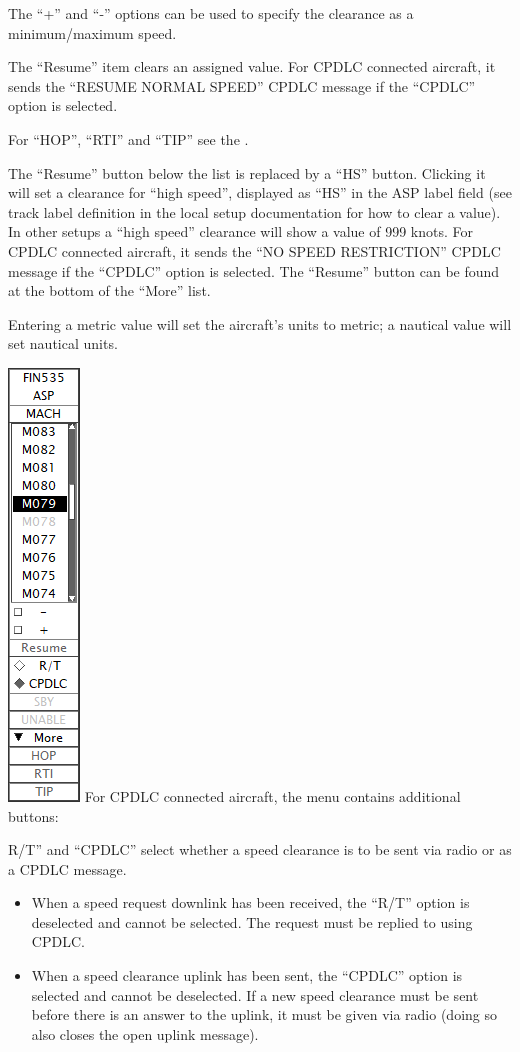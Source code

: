\documentclass[11pt,a4paper,oldfontcommands]{memoir}
\begin{document}
The “+” and “-” options can be used to specify the clearance
as a minimum/maximum speed.

The “Resume” item clears an assigned value. For CPDLC connected aircraft, it sends the “RESUME NORMAL SPEED” CPDLC message if the “CPDLC” option is selected.

For “HOP”, “RTI” and “TIP” see the \textit{}.

The “Resume” button below the list is replaced by a “HS” button. Clicking it will set a clearance for “high speed”, displayed as “HS” in the ASP label field (see track label definition in the local setup documentation for how to clear a value). In other setups a “high speed” clearance will show a value of 999 knots. For CPDLC connected aircraft, it sends the “NO SPEED RESTRICTION” CPDLC message if the “CPDLC” option is selected. The “Resume” button can be found at the bottom of the “More” list.

Entering a metric value will set the aircraft’s units to metric; a nautical value will set
nautical units.

\includegraphics{img/aspmachdl.png}
For CPDLC connected aircraft, the menu contains additional buttons:

R/T” and “CPDLC” select whether a speed clearance is to be sent via radio or as a
CPDLC message.

\begin{itemize}
    \item When a speed request downlink has been received, the “R/T” option is deselected and cannot be selected. The request must be replied to using CPDLC.
    \item When a speed clearance uplink has been sent, the “CPDLC” option is selected and cannot be deselected. If a new speed clearance must be sent before there is an answer to the uplink, it must be given via radio (doing so also closes the open uplink message).
\end{itemize}
\end{document}
